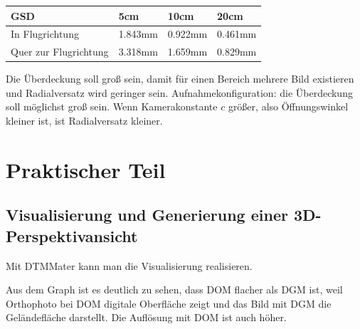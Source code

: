 \documentclass[12pt]{article}
\begin{document}
\begin{table}[ht] \centering 
	\begin{tabular}{|l|l|l|l|}
		\hline
		GSD                   & 5cm     & 10cm    & 20cm    \\ \hline
		In Flugrichtung       & 1.843mm & 0.922mm & 0.461mm \\ \hline
		Quer zur Flugrichtung & 3.318mm & 1.659mm & 0.829mm \\ \hline
	\end{tabular}
\end{table}
\newline
Die Überdeckung soll groß sein, damit für einen Bereich mehrere Bild existieren und Radialversatz wird geringer sein. \newline
\newline
Aufnahmekonfiguration: die Überdeckung soll möglichst groß sein. Wenn Kamerakonstante $c$ größer, also Öffnungswinkel kleiner ist, ist Radialversatz kleiner. 
\section{Praktischer Teil}
\subsection{Visualisierung und Generierung einer 3D-Perspektivansicht}
Mit DTMMater kann man die Visualisierung realisieren.
\begin{figure}[ht]\centering
\end{figure}
\newline
Aus dem Graph ist es deutlich zu sehen, dass DOM flacher als DGM ist, weil Orthophoto bei DOM digitale Oberfläche zeigt und das Bild mit DGM die Geländefläche darstellt. Die Auflösung mit DOM ist auch höher.
\newpage
\end{document}
